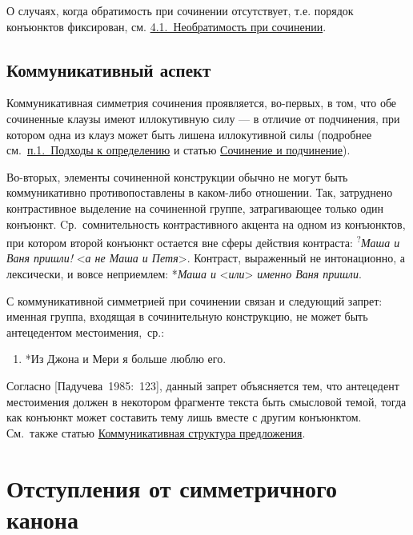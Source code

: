 О случаях, когда обратимость при сочинении отсутствует, т.е. порядок
конъюнктов фиксирован, см. \underline{4.1.~Необратимость при сочинении}.

\subsection{Коммуникативный
аспект}\label{ux43aux43eux43cux43cux443ux43dux438ux43aux430ux442ux438ux432ux43dux44bux439-ux430ux441ux43fux435ux43aux442}

Коммуникативная симметрия сочинения проявляется, во-первых, в том, что
обе сочиненные клаузы имеют иллокутивную силу --- в отличие от
подчинения, при котором одна из клауз может быть лишена иллокутивной
силы (подробнее см.~\underline{п.1.~Подходы к определению} и статью
\underline{Сочинение и подчинение}).

Во-вторых, элементы сочиненной конструкции обычно не могут быть
коммуникативно противопоставлены в каком-либо отношении. Так, затруднено
контрастивное выделение на сочиненной группе, затрагивающее только один
конъюнкт. Cр.~сомнительность контрастивного акцента на одном из
конъюнктов, при котором второй конъюнкт остается вне сферы действия
контраста: \textsuperscript{?}\textit{Маша и Ваня пришли!}
\textless{}\textit{а не Маша и Петя}\textgreater. Контраст, выраженный не
интонационно, а лексически, и вовсе неприемлем: *\textit{Маша и}
\textless{}\textit{или}\textgreater{} \textit{именно Ваня пришли}.

С коммуникативной симметрией при сочинении связан и следующий запрет:
именная группа, входящая в сочинительную конструкцию, не может быть
антецедентом местоимения,~ср.:

\begin{enumerate}
\def\labelenumi{(\arabic{enumi})}
\setcounter{enumi}{24}
\item
  *Из Джона и Мери я больше люблю его.
\end{enumerate}

Согласно {[}Падучева~1985:~123{]}, данный запрет объясняется тем, что
антецедент местоимения должен в некотором фрагменте текста быть
смысловой темой, тогда как конъюнкт может составить тему лишь вместе с
другим конъюнктом. См.~также статью \underline{Коммуникативная структура
предложения}.

\section{Отступления от симметричного
канона}\label{ux43eux442ux441ux442ux443ux43fux43bux435ux43dux438ux44f-ux43eux442-ux441ux438ux43cux43cux435ux442ux440ux438ux447ux43dux43eux433ux43e-ux43aux430ux43dux43eux43dux430}

